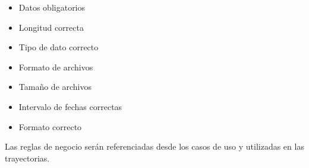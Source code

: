 \begin{enumerate}[{\bf RF01.}]
\begin{itemize}
		\item Datos obligatorios
		\item Longitud correcta
		\item Tipo de dato correcto
		\item Formato de archivos
		\item Tamaño de archivos
		\item Intervalo de fechas correctas
		\item Formato correcto
	\end{itemize}
	Las reglas de negocio serán referenciadas desde los casos de uso y utilizadas en las trayectorias.
\end{enumerate}



